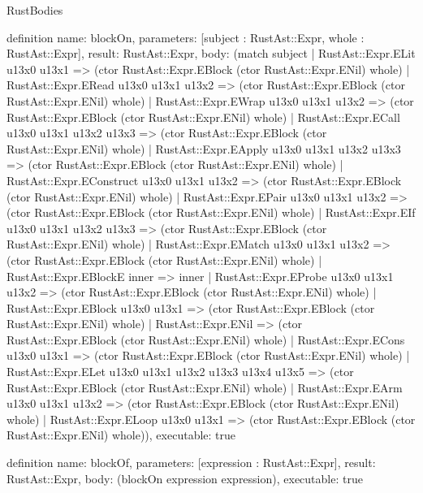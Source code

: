 \begin{lexlean}{RustBodies}
\begin{semanticmodule}
definition{
  name: blockOn,
  parameters: [subject : RustAst::Expr, whole : RustAst::Expr],
  result: RustAst::Expr,
  body: (match subject
    | RustAst::Expr.ELit u13x0 u13x1 => (ctor RustAst::Expr.EBlock (ctor RustAst::Expr.ENil) whole)
    | RustAst::Expr.ERead u13x0 u13x1 u13x2 => (ctor RustAst::Expr.EBlock (ctor RustAst::Expr.ENil) whole)
    | RustAst::Expr.EWrap u13x0 u13x1 u13x2 => (ctor RustAst::Expr.EBlock (ctor RustAst::Expr.ENil) whole)
    | RustAst::Expr.ECall u13x0 u13x1 u13x2 u13x3 => (ctor RustAst::Expr.EBlock (ctor RustAst::Expr.ENil) whole)
    | RustAst::Expr.EApply u13x0 u13x1 u13x2 u13x3 => (ctor RustAst::Expr.EBlock (ctor RustAst::Expr.ENil) whole)
    | RustAst::Expr.EConstruct u13x0 u13x1 u13x2 => (ctor RustAst::Expr.EBlock (ctor RustAst::Expr.ENil) whole)
    | RustAst::Expr.EPair u13x0 u13x1 u13x2 => (ctor RustAst::Expr.EBlock (ctor RustAst::Expr.ENil) whole)
    | RustAst::Expr.EIf u13x0 u13x1 u13x2 u13x3 => (ctor RustAst::Expr.EBlock (ctor RustAst::Expr.ENil) whole)
    | RustAst::Expr.EMatch u13x0 u13x1 u13x2 => (ctor RustAst::Expr.EBlock (ctor RustAst::Expr.ENil) whole)
    | RustAst::Expr.EBlockE inner => inner
    | RustAst::Expr.EProbe u13x0 u13x1 u13x2 => (ctor RustAst::Expr.EBlock (ctor RustAst::Expr.ENil) whole)
    | RustAst::Expr.EBlock u13x0 u13x1 => (ctor RustAst::Expr.EBlock (ctor RustAst::Expr.ENil) whole)
    | RustAst::Expr.ENil => (ctor RustAst::Expr.EBlock (ctor RustAst::Expr.ENil) whole)
    | RustAst::Expr.ECons u13x0 u13x1 => (ctor RustAst::Expr.EBlock (ctor RustAst::Expr.ENil) whole)
    | RustAst::Expr.ELet u13x0 u13x1 u13x2 u13x3 u13x4 u13x5 => (ctor RustAst::Expr.EBlock (ctor RustAst::Expr.ENil) whole)
    | RustAst::Expr.EArm u13x0 u13x1 u13x2 => (ctor RustAst::Expr.EBlock (ctor RustAst::Expr.ENil) whole)
    | RustAst::Expr.ELoop u13x0 u13x1 => (ctor RustAst::Expr.EBlock (ctor RustAst::Expr.ENil) whole)),
  executable: true
}

definition{
  name: blockOf,
  parameters: [expression : RustAst::Expr],
  result: RustAst::Expr,
  body: (blockOn expression expression),
  executable: true
}


\end{semanticmodule}
\end{lexlean}
